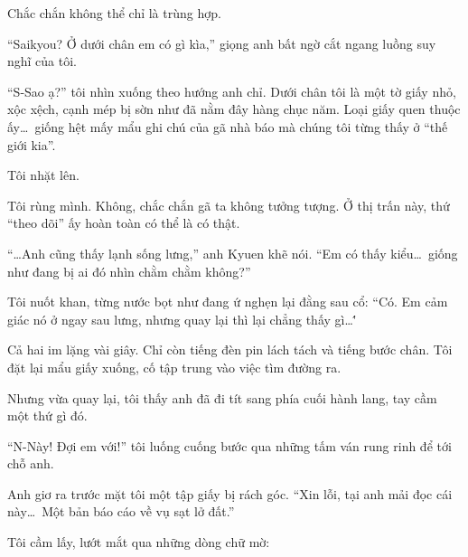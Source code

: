 \documentclass[../main.tex]{subfiles}
\begin{document}
Chắc chắn không thể chỉ là trùng hợp.

``Saikyou? Ở dưới chân em có gì kìa,'' giọng anh bất ngờ cắt ngang luồng suy nghĩ của tôi.

``S-Sao ạ?'' tôi nhìn xuống theo hướng anh chỉ. Dưới chân tôi là một tờ giấy nhỏ, xộc xệch, cạnh mép bị sờn như đã nằm đây hàng chục năm. Loại giấy quen thuộc ấy\dots\ giống hệt mấy mẩu ghi chú của gã nhà báo mà chúng tôi từng thấy ở ``thế giới kia''.

Tôi nhặt lên.


Tôi rùng mình. Không, chắc chắn gã ta không tưởng tượng. Ở thị trấn này, thứ ``theo dõi'' ấy hoàn toàn có thể là có thật.

``\dots Anh cũng thấy lạnh sống lưng,'' anh Kyuen khẽ nói. ``Em có thấy kiểu\dots\ giống như đang bị ai đó nhìn chằm chằm không?''

Tôi nuốt khan, từng nước bọt như đang ứ nghẹn lại đằng sau cổ: ``Có. Em cảm giác nó ở ngay sau lưng, nhưng quay lại thì lại chẳng thấy gì\dots\''

Cả hai im lặng vài giây. Chỉ còn tiếng đèn pin lách tách và tiếng bước chân. Tôi đặt lại mẩu giấy xuống, cố tập trung vào việc tìm đường ra.

Nhưng vừa quay lại, tôi thấy anh đã đi tít sang phía cuối hành lang, tay cầm một thứ gì đó.

``N-Này! Đợi em với!'' tôi luống cuống bước qua những tấm ván rung rinh để tới chỗ anh.

Anh giơ ra trước mặt tôi một tập giấy bị rách góc. ``Xin lỗi, tại anh mải đọc cái này\dots\ Một bản báo cáo về vụ sạt lở đất.''

Tôi cầm lấy, lướt mắt qua những dòng chữ mờ:

\end{document}
